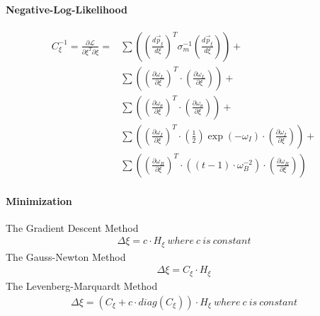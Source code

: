 \documentclass[review]{elsarticle}
\begin{document}
\paragraph{Negative-Log-Likelihood}
\begin{equation} \begin{alignedat}{-1}
        C_{\xi}^{-1}=\frac{\partial\mathcal{L}}{\partial\xi^{T}\partial\xi}=
        &\sum\left(\left(\frac{d\vec{p}_{\xi}}{d\xi}\right)^{T}\sigma_{m}^{-1}\left(\frac{d\vec{p}_{\xi}}{d\xi}\right)\right)+\\
        &\sum\left(\left(\frac{\partial\omega_{L}}{\partial\xi}\right)^{T}\cdot\left(\frac{\partial\omega_{L}}{\partial\xi}\right)\right)+\\
        &\sum\left(\left(\frac{\partial\omega_{\theta}}{\partial\xi}\right)^{T}\cdot\left(\frac{\partial\omega_{\theta}}{\partial\xi}\right)\right)+\\
        &\sum\left(\left(\frac{\partial\omega_{I}}{\partial\xi}\right)^{T}\cdot\left(\frac{1}{2}\right)\exp(-\omega_{I})\cdot\left(\frac{\partial\omega_{I}}{\partial\xi}\right)\right)+\\
        &\sum\left(\left(\frac{\partial\omega_{B}}{\partial\xi}\right)^{T}\cdot\left(\left(t-1\right)\cdot\omega_{B}^{-2}\right)\cdot\left(\frac{\partial\omega_{B}}{\partial\xi}\right)\right)
\end{alignedat} \end{equation} 


\paragraph{Minimization}
The Gradient Descent Method
\begin{equation} \begin{alignedat}{-1}
        \Delta\xi=c\cdot H_{\xi}\ where\ c\ is\ constant
\end{alignedat} \end{equation} 
The Gauss-Newton Method
\begin{equation} \begin{alignedat}{-1}
        \Delta\xi=C_{\xi}\cdot H_{\xi}
\end{alignedat} \end{equation} 
The Levenberg-Marquardt Method
\begin{equation} \begin{alignedat}{-1}
        \Delta\xi=\left(C_{\xi}+c\cdot diag\left(C_{\xi}\right)\right)\cdot H_{\xi}\ where\ c\ is\ constant
\end{alignedat} \end{equation} 
\end{document}
